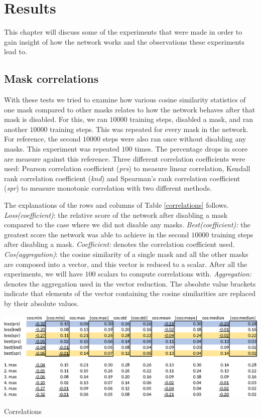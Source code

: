 \documentclass[12pt]{report}
\begin{document}
\chapter{Results}
This chapter will discuss some of the experiments that were made in order to gain insight of how the network works and the observations these experiments lead to.
\section{Mask correlations}
With these tests we tried to examine how various cosine similarity statistics of one mask compared to other masks relates to how the network behaves after that mask is disabled. For this, we ran $10000$ training steps, disabled a mask, and ran another $10000$ training steps. This was repeated for every mask in the network. For reference, the second $10000$ steps were also ran once without disabling any masks. This experiment was repeated $100$ times. The percentage drops in score are measure against this reference. Three different correlation coefficients were used: Pearson correlation coefficient (\textit{prs}) \cite{prs} to measure linear correlation, Kendall rank correlation coefficient (\textit{knd}) \cite{knd} and Spearman's rank correlation coefficient (\textit{spr}) \cite{spr} to measure monotonic correlation with two different methods.

The explanations of the rows and columns of Table \ref{correlations} follows. \textit{Loss(coefficient)}: the relative score of the network after disabling a mask compared to the case where we did not disable any masks. \textit{Best(coefficient):} the greatest score the network was able to achieve in the second $10000$ training steps after disabling a mask. \textit{Coefficient:} denotes the correlation coefficient used. \textit{Cos(aggregation)}: the cosine similarity of a single mask and all the other masks are composed into a vector, and this vector is reduced to a scalar. After all the experiments, we will have $100$ scalars to compute correlations with. \textit{Aggregation:} denotes the aggregation used in the vector reduction. The absolute value brackets indicate that elements of the vector containing the cosine similarities are replaced by their absolute values.

\begin{table}[h!]
	\centering
	\includegraphics[scale=0.85]{dia/table.eps}
	\caption{Correlations}\label{correlations}
\end{table}
\end{document}

